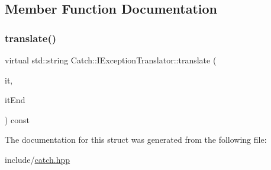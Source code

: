 \subsection{Member Function Documentation}
\mbox{\label{struct_catch_1_1_i_exception_translator_a2a554b96ed5ed411e7c796b6b42837a5}} 
\subsubsection{\texorpdfstring{translate()}{translate()}}
{\footnotesize\ttfamily virtual std\+::string Catch\+::\+I\+Exception\+Translator\+::translate (\begin{DoxyParamCaption}\item[{Exception\+Translators\+::const\+\_\+iterator}]{it,  }\item[{Exception\+Translators\+::const\+\_\+iterator}]{it\+End }\end{DoxyParamCaption}) const\hspace{0.3cm}{\ttfamily [pure virtual]}}



The documentation for this struct was generated from the following file\+:\begin{DoxyCompactItemize}
\item 
include/\mbox{\hyperlink{catch_8hpp}{catch.\+hpp}}\end{DoxyCompactItemize}
